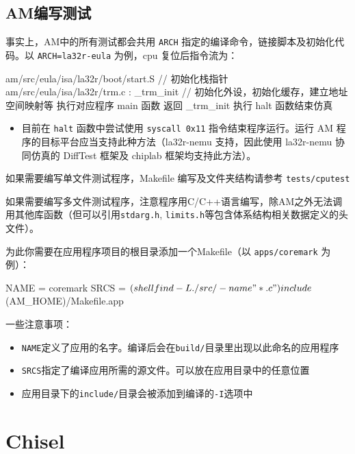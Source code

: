 \subsection{AM编写测试}\label{sec:06-agility-005}

事实上，AM中的所有测试都会共用 \texttt{ARCH} 指定的编译命令，链接脚本及初始化代码。以 \texttt{ARCH=la32r-eula} 为例，cpu 复位后指令流为：

\begin{CodeBlock}[language=BookText]
am/src/eula/isa/la32r/boot/start.S        // 初始化栈指针
am/src/eula/isa/la32r/trm.c : _trm_init   // 初始化外设，初始化缓存，建立地址空间映射等
执行对应程序 main 函数
返回 _trm_init 执行 halt 函数结束仿真
\end{CodeBlock}

\begin{itemize}
\tightlist
\item
  目前在 \texttt{halt} 函数中尝试使用 \texttt{syscall\ 0x11} 指令结束程序运行。运行 AM 程序的目标平台应当支持此种方法（la32r-nemu 支持，因此使用 la32r-nemu 协同仿真的 DiffTest 框架及 chiplab 框架均支持此方法）。
\end{itemize}

如果需要编写单文件测试程序，Makefile 编写及文件夹结构请参考 \texttt{tests/cputest}

如果需要编写多文件测试程序，注意程序用C/C++语言编写，除AM之外无法调用其他库函数（但可以引用\texttt{stdarg.h}, \texttt{limits.h}等包含体系结构相关数据定义的头文件）。

为此你需要在应用程序项目的根目录添加一个Makefile（以 \texttt{apps/coremark} 为例）：

\begin{CodeBlock}[language=BookMake]
NAME = coremark
SRCS = $(shell find -L ./src/ -name "*.c")
include $(AM_HOME)/Makefile.app
\end{CodeBlock}

一些注意事项：

\begin{itemize}
\item
  \texttt{NAME}定义了应用的名字。编译后会在\texttt{build/}目录里出现以此命名的应用程序
\item
  \texttt{SRCS}指定了编译应用所需的源文件。可以放在应用目录中的任意位置
\item
  应用目录下的\texttt{include/}目录会被添加到编译的\texttt{-I}选项中
\end{itemize}

\section{Chisel}\label{sec:06-agility-006}

